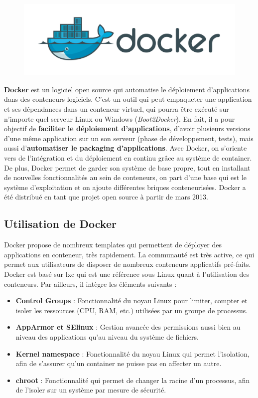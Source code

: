\begin{onehalfspace}
\begin{figure}
\centering
\includegraphics[scale=0.15]{chapitre2/assets/docker}
\end{figure}
\noindent \textbf{Docker} est un logiciel open source qui automatise le déploiement d'applications dans des conteneurs logiciels. C'est un outil qui peut empaqueter une application et ses dépendances dans un conteneur virtuel, qui pourra être exécuté sur n'importe quel serveur Linux ou Windows (\emph{Boot2Docker}). En fait, il a pour objectif de \textbf{faciliter le déploiement d'applications}, d'avoir plusieurs versions d'une même application sur un son serveur (phase de développement, tests), mais aussi d'\textbf{automatiser le packaging d'applications}. Avec Docker, on s'oriente vers de l'intégration et du déploiement en continu grâce au système de container. De plus, Docker permet de garder son système de base propre, tout en installant de nouvelles fonctionnalités au sein de conteneurs, on part d'une base qui est le système d'exploitation et on ajoute différentes briques conteneurisées. Docker a été distribué en tant que projet open source à partir de mars 2013.

\subsection{Utilisation de Docker}
Docker propose de nombreux templates qui permettent de déployer des applications en conteneur, très rapidement. La communauté est très active, ce qui permet aux utilisateurs de disposer de nombreux conteneurs applicatifs pré-faits.
Docker est basé sur \acrshort{lxc} qui est une référence sous Linux quant à l'utilisation des conteneurs. Par ailleurs, il intègre les éléments suivants :
\begin{itemize}
\item \textbf{Control Groups} : Fonctionnalité du noyau Linux pour limiter, compter et isoler les ressources (CPU, RAM, etc.) utilisées par un groupe de processus.
\item \textbf{AppArmor et SElinux} : Gestion avancée des permissions aussi bien au niveau des applications qu'au niveau du système de fichiers.
\item \textbf{Kernel namespace} : Fonctionnalité du noyau Linux qui permet l'isolation, afin de s'assurer qu'un container ne puisse pas en affecter un autre.
\item \textbf{chroot} : Fonctionnalité qui permet de changer la racine d'un processus, afin de l'isoler sur un système par mesure de sécurité.
\end{itemize}


\end{onehalfspace}
